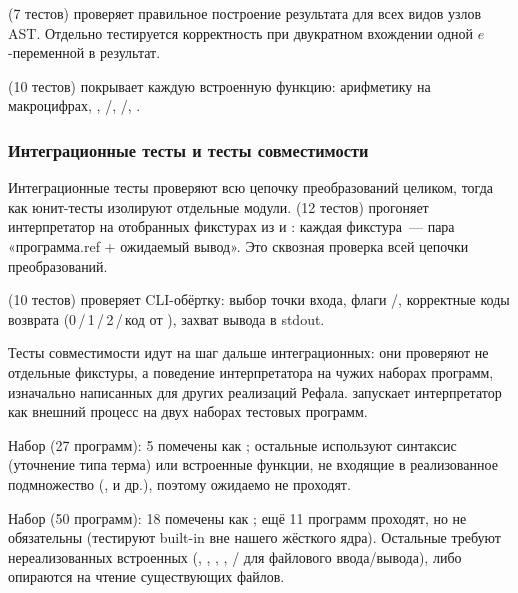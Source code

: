  (7 тестов) проверяет правильное построение результата
для всех видов узлов AST. Отдельно тестируется корректность при
двукратном вхождении одной \(e\)-переменной в результат.

 (10 тестов) покрывает каждую встроенную функцию:
арифметику на макроцифрах, , /,
/, .

\subsubsection{Интеграционные тесты и тесты совместимости}

Интеграционные тесты проверяют всю цепочку преобразований целиком, тогда как
юнит-тесты изолируют отдельные модули.  (12 тестов)
прогоняет интерпретатор на
отобранных фикстурах из  и
: каждая фикстура~--- пара «программа.ref + ожидаемый вывод».
Это сквозная проверка всей цепочки преобразований.

 (10 тестов) проверяет CLI-обёртку: выбор точки входа,
флаги /, корректные коды возврата
(0\,/\,1\,/\,2\,/\,код от ), захват вывода в stdout.

Тесты совместимости идут на шаг дальше интеграционных: они проверяют не отдельные
фикстуры, а поведение интерпретатора на чужих наборах программ, изначально написанных
для других реализаций Рефала.  запускает интерпретатор как
внешний процесс на двух наборах тестовых программ.

Набор  (27 программ): 5 помечены как ;
остальные используют синтаксис \prog{:} (уточнение типа терма) или встроенные
функции, не входящие в реализованное подмножество (,
 и др.), поэтому ожидаемо не проходят.

Набор  (50 программ): 18 помечены как ;
ещё 11 программ проходят, но не обязательны (тестируют built-in вне нашего
жёсткого ядра). Остальные требуют нереализованных встроенных
(, , , , /
для файлового ввода/вывода), либо опираются на чтение существующих файлов.

